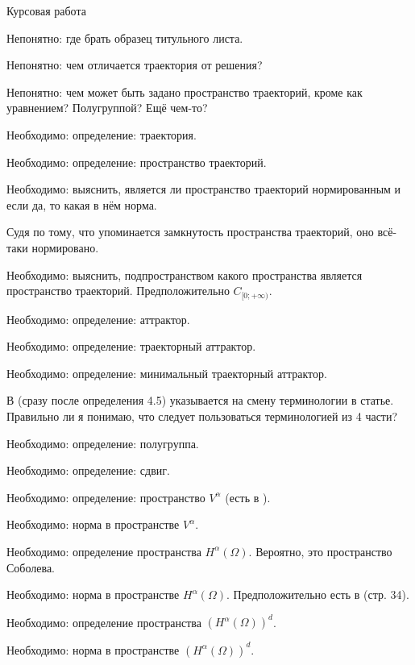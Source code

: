 
\LARGE



Курсовая работа


Непонятно: где брать образец титульного листа.


Непонятно: чем отличается траектория от решения?


Непонятно: чем может быть задано пространство траекторий, кроме как уравнением?
Полугруппой?
Ещё чем-то?


Необходимо: определение: траектория.


Необходимо: определение: пространство траекторий.


Необходимо: выяснить, является ли пространство траекторий нормированным и если да, то какая в нём норма.


Судя по тому, что упоминается замкнутость пространства траекторий, оно всё-таки нормировано.


Необходимо: выяснить, подпространством какого пространства является пространство траекторий.
Предположительно $C_{[0;+\infty)}$.


Необходимо: определение: аттрактор.


Необходимо: определение: траекторный аттрактор.


Необходимо: определение: минимальный траекторный аттрактор.

В \cite{Kondratyev} (сразу после определения 4.5) указывается на смену терминологии в статье.
Правильно ли я понимаю, что следует пользоваться терминологией из 4 части?


Необходимо: определение: полугруппа.


Необходимо: определение: сдвиг.


Необходимо: определение: пространство $V^\alpha$ (есть в \cite{Fursikov}).


Необходимо: норма в пространстве $V^\alpha$.


Необходимо: определение пространства $H^\alpha(\Omega)$.
Вероятно, это пространство Соболева.


Необходимо: норма в пространстве $H^\alpha(\Omega)$.
Предположительно есть в \cite{Vorotnikov} (стр. 34).


Необходимо: определение пространства $(H^\alpha(\Omega))^d$.


Необходимо: норма в пространстве $(H^\alpha(\Omega))^d$.



